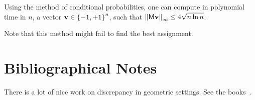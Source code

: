 \begin{theorem}
    Using the method of conditional probabilities, one can compute in
    polynomial time in $n$, a vector $\mathbf{v} \in \left\{ {-1,+1} \right\}^n$, such
    that $\left\| {\mathsf{M} \mathbf{v}} \right\|_\infty \leq 4 \sqrt{n \ln{n}}$.%
\end{theorem}

Note that this method might fail to find the best
assignment. 





\section{Bibliographical Notes}

There is a lot of nice work on discrepancy in geometric settings. See
the books~\cite{c-dmrc-01, m-gd-99}.




\ChapterEnd{}

